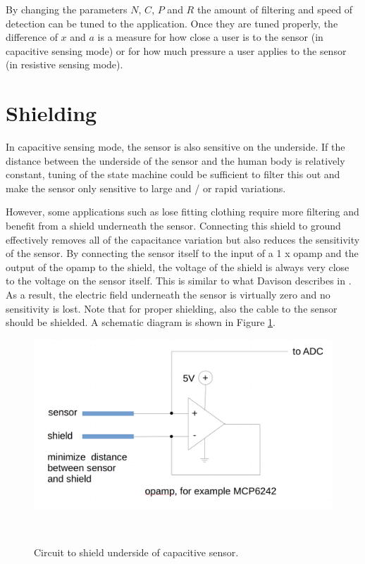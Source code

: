 \documentclass{sigchi-ext}
\begin{document}
By changing the parameters $N$, $C$, $P$ and $R$ the amount of filtering and
speed of detection can be tuned to the application. Once they are tuned
properly, the difference of $x$ and $a$ is a measure for how close a user is to
the sensor (in capacitive sensing mode) or for how much pressure a user applies
to the sensor (in resistive sensing mode).

\section{Shielding}
In capacitive sensing mode, the sensor is also sensitive on the underside. If
the distance between the underside of the sensor and the human body is
relatively constant, tuning of the state machine could be sufficient to filter
this out and make the sensor only sensitive to large and / or rapid variations.

However, some applications such as lose fitting clothing require more filtering
and benefit from a shield underneath the
sensor. Connecting this shield to ground effectively removes all of the
capacitance variation but also reduces the sensitivity of the sensor. By
connecting the sensor itself to the input of a 1 x opamp and the output of the
opamp to the shield, the voltage of the shield is always very close to the
voltage on the sensor itself. This is similar to what Davison describes in
\cite{Davison2013a}. As a result, the electric field underneath the sensor is
virtually zero and no sensitivity is lost. Note that for proper shielding, also
the cable to the sensor should be shielded. A schematic diagram
is shown in Figure \ref{fig:shield_circuit}.


\begin{figure}
\centering
\includegraphics[width=0.9\columnwidth]{figures/shield_circuit}
  \caption{Circuit to shield underside of capacitive
sensor.}~\label{fig:shield_circuit}
\end{figure}
\end{document}
